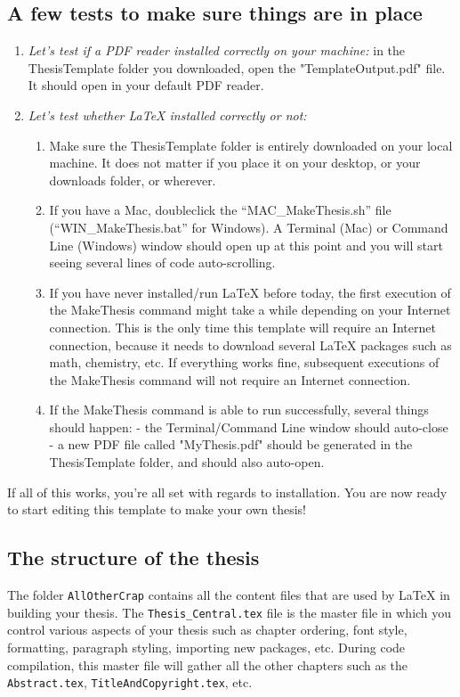 \documentclass[12pt]{report} %
\begin{document}
\subsection*{A few tests to make sure things are in place}
\begin{enumerate}
\item \textit{Let's test if a PDF reader installed correctly on your machine:} in the ThesisTemplate folder you downloaded, open the "TemplateOutput.pdf" file. It should open in your default PDF reader.
\item \textit{Let's test whether LaTeX installed correctly or not:}
\begin{enumerate}
\item Make sure the ThesisTemplate folder is entirely downloaded on your local machine. It does not matter if you place it on your desktop, or your downloads folder, or wherever.
\item If you have a Mac, doubleclick the ``MAC\_{}MakeThesis.sh'' file (``WIN\_{}MakeThesis.bat'' for Windows). A Terminal (Mac) or Command Line (Windows) window should open up at this point and you will start seeing several lines of code auto-scrolling.
\item If you have never installed/run \LaTeX{} before today, the first execution of the MakeThesis command might take a while depending on your Internet connection. This is the only time this template will require an Internet connection, because it needs to download several \LaTeX{} packages such as math, chemistry, etc. If everything works fine, subsequent executions of the MakeThesis command will not require an Internet connection.
\item If the MakeThesis command is able to run successfully, several things should happen:
- the Terminal/Command Line window should auto-close
- a new PDF file called "MyThesis.pdf" should be generated in the ThesisTemplate folder, and should also auto-open.
\end{enumerate}

\end{enumerate}
If all of this works, you're all set with regards to installation. You are now ready to start editing this template to make your own thesis!

\subsection*{The structure of the thesis}
The folder \verb|AllOtherCrap| contains all the content files that are used by \LaTeX{} in building your thesis. The \verb|Thesis_Central.tex| file is the master file in which you control various aspects of your thesis such as chapter ordering, font style, formatting, paragraph styling, importing new packages, etc. During code compilation, this master file will gather all the other chapters such as the \verb|Abstract.tex|, \verb|TitleAndCopyright.tex|, etc.
\end{document}
